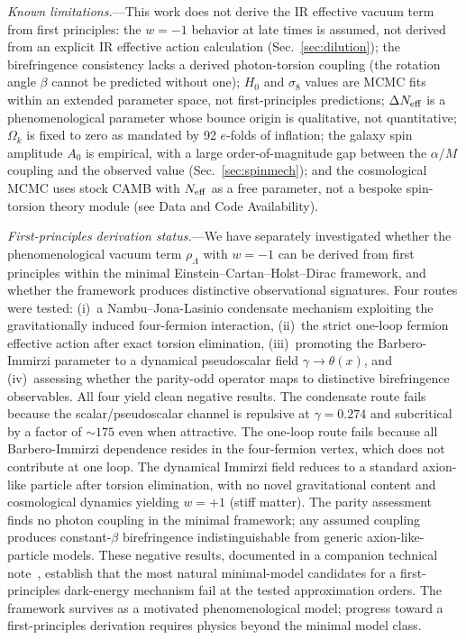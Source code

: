 \documentclass[aps,prd,twocolumn,superscriptaddress,showpacs,preprintnumbers,nofootinbib,longbibliography,floatfix]{revtex4-2}
\newcommand{\Neff}{N_{\rm eff}}
\begin{document}
\textit{Known limitations.}---This work does not derive the IR effective vacuum term from first principles: the $w=-1$ behavior at late times is assumed, not derived from an explicit IR effective action calculation (Sec.~\ref{sec:dilution}); the birefringence consistency lacks a derived photon-torsion coupling (the rotation angle $\beta$ cannot be predicted without one); $H_0$ and $\sigma_8$ values are MCMC fits within an extended parameter space, not first-principles predictions; $\Delta\Neff$ is a phenomenological parameter whose bounce origin is qualitative, not quantitative; $\Omega_k$ is fixed to zero as mandated by 92 $e$-folds of inflation; the galaxy spin amplitude $A_0$ is empirical, with a large order-of-magnitude gap between the $\alpha/M$ coupling and the observed value (Sec.~\ref{sec:spinmech}); and the cosmological MCMC uses stock CAMB with $\Neff$ as a free parameter, not a bespoke spin-torsion theory module (see Data and Code Availability).

\textit{First-principles derivation status.}---We have separately investigated whether the phenomenological vacuum term $\rho_\Lambda$ with $w=-1$ can be derived from first principles within the minimal Einstein--Cartan--Holst--Dirac framework, and whether the framework produces distinctive observational signatures. Four routes were tested: (i)~a Nambu--Jona-Lasinio condensate mechanism exploiting the gravitationally induced four-fermion interaction, (ii)~the strict one-loop fermion effective action after exact torsion elimination, (iii)~promoting the Barbero-Immirzi parameter to a dynamical pseudoscalar field $\gamma\to\theta(x)$, and (iv)~assessing whether the parity-odd operator maps to distinctive birefringence observables. All four yield clean negative results. The condensate route fails because the scalar/pseudoscalar channel is repulsive at $\gamma=0.274$ and subcritical by a factor of ${\sim}175$ even when attractive. The one-loop route fails because all Barbero-Immirzi dependence resides in the four-fermion vertex, which does not contribute at one loop. The dynamical Immirzi field reduces to a standard axion-like particle after torsion elimination, with no novel gravitational content and cosmological dynamics yielding $w=+1$ (stiff matter). The parity assessment finds no photon coupling in the minimal framework; any assumed coupling produces constant-$\beta$ birefringence indistinguishable from generic axion-like-particle models. These negative results, documented in a companion technical note~\cite{Golden2026supplement}, establish that the most natural minimal-model candidates for a first-principles dark-energy mechanism fail at the tested approximation orders. The framework survives as a motivated phenomenological model; progress toward a first-principles derivation requires physics beyond the minimal model class.
\end{document}
